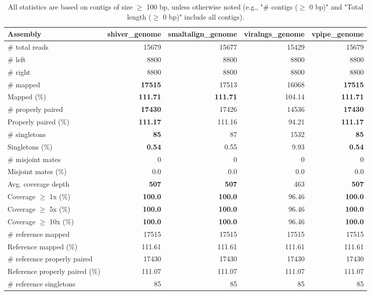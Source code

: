 \documentclass[12pt,a4paper]{article}
\begin{document}
\begin{table}[ht]
\begin{center}
\caption{All statistics are based on contigs of size $\geq$ 100 bp, unless otherwise noted (e.g., "\# contigs ($\geq$ 0 bp)" and "Total length ($\geq$ 0 bp)" include all contigs).}
\begin{tabular}{|l*{4}{|r}|}
\hline
Assembly & shiver\_genome & smaltalign\_genome & viralngs\_genome & vpipe\_genome \\ \hline
\# total reads & 15679 & 15677 & 15429 & 15679 \\ \hline
\# left & 8800 & 8800 & 8800 & 8800 \\ \hline
\# right & 8800 & 8800 & 8800 & 8800 \\ \hline
\# mapped & {\bf 17515} & 17513 & 16068 & {\bf 17515} \\ \hline
Mapped (\%) & {\bf 111.71} & {\bf 111.71} & 104.14 & {\bf 111.71} \\ \hline
\# properly paired & {\bf 17430} & 17426 & 14536 & {\bf 17430} \\ \hline
Properly paired (\%) & {\bf 111.17} & 111.16 & 94.21 & {\bf 111.17} \\ \hline
\# singletons & {\bf 85} & 87 & 1532 & {\bf 85} \\ \hline
Singletons (\%) & {\bf 0.54} & 0.55 & 9.93 & {\bf 0.54} \\ \hline
\# misjoint mates & 0 & 0 & 0 & 0 \\ \hline
Misjoint mates (\%) & 0.0 & 0.0 & 0.0 & 0.0 \\ \hline
Avg. coverage depth & {\bf 507} & {\bf 507} & 463 & {\bf 507} \\ \hline
Coverage $\geq$ 1x (\%) & {\bf 100.0} & {\bf 100.0} & 96.46 & {\bf 100.0} \\ \hline
Coverage $\geq$ 5x (\%) & {\bf 100.0} & {\bf 100.0} & 96.46 & {\bf 100.0} \\ \hline
Coverage $\geq$ 10x (\%) & {\bf 100.0} & {\bf 100.0} & 96.46 & {\bf 100.0} \\ \hline
\# reference mapped & 17515 & 17515 & 17515 & 17515 \\ \hline
Reference mapped (\%) & 111.61 & 111.61 & 111.61 & 111.61 \\ \hline
\# reference properly paired & 17430 & 17430 & 17430 & 17430 \\ \hline
Reference properly paired (\%) & 111.07 & 111.07 & 111.07 & 111.07 \\ \hline
\# reference singletons & 85 & 85 & 85 & 85 \\ \hline

\end{tabular}
\end{center}
\end{table}
\end{document}
